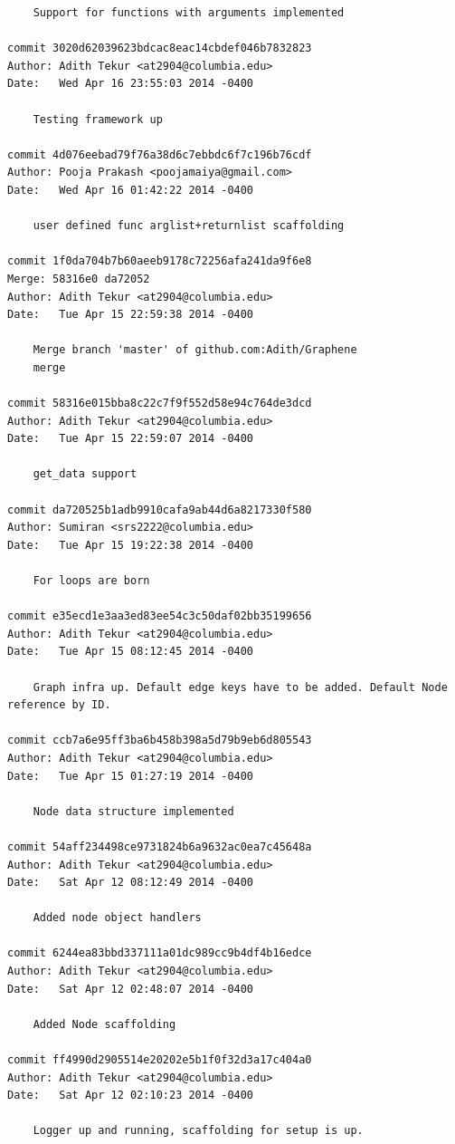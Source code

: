 \documentclass[a4paper]{article}
\begin{document}
\begin{verbatim}
    Support for functions with arguments implemented

commit 3020d62039623bdcac8eac14cbdef046b7832823
Author: Adith Tekur <at2904@columbia.edu>
Date:   Wed Apr 16 23:55:03 2014 -0400

    Testing framework up

commit 4d076eebad79f76a38d6c7ebbdc6f7c196b76cdf
Author: Pooja Prakash <poojamaiya@gmail.com>
Date:   Wed Apr 16 01:42:22 2014 -0400

    user defined func arglist+returnlist scaffolding

commit 1f0da704b7b60aeeb9178c72256afa241da9f6e8
Merge: 58316e0 da72052
Author: Adith Tekur <at2904@columbia.edu>
Date:   Tue Apr 15 22:59:38 2014 -0400

    Merge branch 'master' of github.com:Adith/Graphene
    merge

commit 58316e015bba8c22c7f9f552d58e94c764de3dcd
Author: Adith Tekur <at2904@columbia.edu>
Date:   Tue Apr 15 22:59:07 2014 -0400

    get_data support

commit da720525b1adb9910cafa9ab44d6a8217330f580
Author: Sumiran <srs2222@columbia.edu>
Date:   Tue Apr 15 19:22:38 2014 -0400

    For loops are born

commit e35ecd1e3aa3ed83ee54c3c50daf02bb35199656
Author: Adith Tekur <at2904@columbia.edu>
Date:   Tue Apr 15 08:12:45 2014 -0400

    Graph infra up. Default edge keys have to be added. Default Node reference by ID.

commit ccb7a6e95ff3ba6b458b398a5d79b9eb6d805543
Author: Adith Tekur <at2904@columbia.edu>
Date:   Tue Apr 15 01:27:19 2014 -0400

    Node data structure implemented

commit 54aff234498ce9731824b6a9632ac0ea7c45648a
Author: Adith Tekur <at2904@columbia.edu>
Date:   Sat Apr 12 08:12:49 2014 -0400

    Added node object handlers

commit 6244ea83bbd337111a01dc989cc9b4df4b16edce
Author: Adith Tekur <at2904@columbia.edu>
Date:   Sat Apr 12 02:48:07 2014 -0400

    Added Node scaffolding

commit ff4990d2905514e20202e5b1f0f32d3a17c404a0
Author: Adith Tekur <at2904@columbia.edu>
Date:   Sat Apr 12 02:10:23 2014 -0400

    Logger up and running, scaffolding for setup is up.


\end{verbatim}
\end{document}
